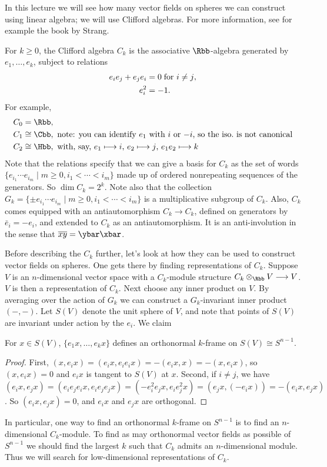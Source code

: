 In this lecture we will see how many vector fields on spheres we can construct using linear algebra; we will use Clifford algebras.  For more information, see for example the book by Strang.

For $k \ge 0$, the Clifford algebra $C_k$ is the associative $\Rbb$-algebra generated by $e_1, \ldots, e_k$, subject to relations
\begin{align*}
e_i e_j + e_j e_i & = 0 \hbox{\;for $i \ne j$}, \\
e_i^2 & = -1.
\end{align*}
For example,
\begin{align*}
C_0 & = \Rbb, \\
C_1 & \cong \Cbb, \hbox{ note: you can identify $e_1$ with $i$ or $-i$, so the iso.\ is not canonical} \\
C_2 & \cong \Hbb, \hbox{ with, say, $e_1 \mapsto i$, $e_2 \mapsto j$, $e_1 e_2 \mapsto k$}
\end{align*}
Note that the relations specify that we can give a basis for $C_k$ as the set of words $\{e_{i_1} \cdots e_{i_m} \mid m \ge 0, i_1 < \cdots < i_m\}$ made up of ordered nonrepeating sequences of the generators.  So $\dim C_k = 2^k$.  Note also that the collection $G_k = \{ \pm e_{i_1} \cdots e_{i_m} \mid m \ge 0, i_1 < \cdots < i_m\}$ is a multiplicative subgroup of $C_k$.  Also, $C_k$ comes equipped with an antiautomorphism $C_k \to C_k$, defined on generators by $\bar e_i = -e_i$, and extended to $C_k$ as an antiautomorphism.  It is an anti-involution in the sense that $\overline{xy} = \ybar\xbar$.

Before describing the $C_k$ further, let's look at how they can be used to construct vector fields on spheres.  One gets there by finding representations of $C_k$. Suppose $V$ is an $n$-dimensional vector space with a $C_k$-module structure $C_k \otimes_\Rbb V \to V$.  $V$ is then a representation of $C_k$.  Next choose any inner product on $V$.  By averaging over the action of $G_k$ we can construct a $G_k$-invariant inner product $(-, -)$.  Let $S(V)$ denote the unit sphere of $V$, and note that points of $S(V)$ are invariant under action by the $e_i$.  We claim
\begin{thm}
For $x \in S(V)$, $\{e_1 x, \ldots, e_k x\}$ defines an orthonormal $k$-frame on $S(V) \cong S^{n-1}$.
\end{thm}
\begin{proof}
First, $(x, e_i x) = (e_i x, e_i e_i x) = -(e_i x, x) = -(x, e_i x)$, so $(x, e_i x) = 0$ and $e_i x$ is tangent to $S(V)$ at $x$.  Second, if $i \ne j$, we have $(e_i x, e_j x) = (e_i e_j e_i x, e_i e_j e_j x) = (-e_i^2 e_j x, e_i e_j^2 x) = (e_j x, (-e_i x)) = -(e_i x, e_j x)$.  So $(e_i x, e_j x) = 0$, and $e_i x$ and $e_j x$ are orthogonal.
\end{proof}
In particular, one way to find an orthonormal $k$-frame on $S^{n-1}$ is to find an $n$-dimensional $C_k$-module. To find as may orthonormal vector fields as possible of $S^{n-1}$ we should find the largest $k$ such that $C_k$ admits an $n$-dimensional module.
Thus we will search for low-dimensional representations of $C_k$.

